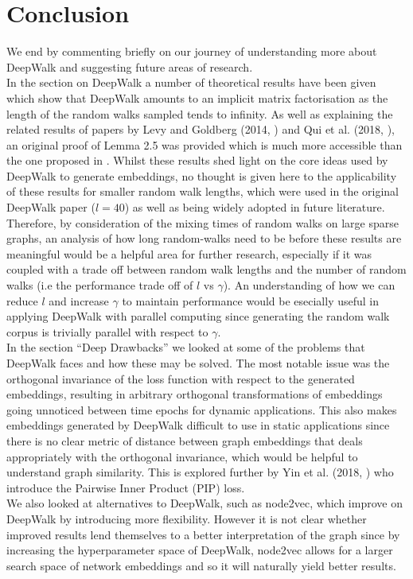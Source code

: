 \documentclass[a4paper]{article}
\begin{document}
\section{Conclusion}
We end by commenting briefly on our journey of understanding more about DeepWalk and suggesting future areas of research.\\
In the section on DeepWalk a number of theoretical results have been given which show that DeepWalk amounts to an implicit matrix factorisation as the length of the random walks sampled tends to infinity.
As well as explaining the related results of papers by Levy and Goldberg (2014, \cite{levy&goldberg}) and  Qui et al. (2018, \cite{qiu2018}), an original proof of Lemma 2.5 was provided which is much more accessible than the one proposed in \cite{qiu2018}.
Whilst these results shed light on the core ideas used by DeepWalk to generate embeddings, no thought is given here to the applicability of these results for smaller random walk lengths, which were used in the original DeepWalk paper ($l = 40$) as well as being widely adopted in future literature. Therefore, by consideration of the mixing times of random walks on large sparse graphs, an analysis of how long random-walks need to be before these
results are meaningful would be a helpful area for further research, especially if it was coupled with a trade off between random walk lengths and the number of random walks (i.e the performance trade off of $l$ vs $\gamma$). An understanding of how we can reduce $l$ and increase $\gamma$ to maintain performance would be esecially useful in applying DeepWalk with parallel computing since generating the random walk corpus is trivially parallel with respect to $\gamma$.\\
In the section ``Deep Drawbacks'' we looked at some of the problems that DeepWalk faces and how these may be solved. The most notable issue was the orthogonal invariance of the loss function with respect to the generated embeddings, resulting in arbitrary orthogonal transformations of embeddings going unnoticed
between time epochs for dynamic applications. This also makes embeddings generated by DeepWalk difficult to use in static applications since there is no clear metric of distance between graph embeddings that deals appropriately with the orthogonal invariance, which would be helpful to understand graph similarity. This is explored further by Yin et al. (2018, \cite{yin2018}) who introduce the Pairwise Inner Product (PIP) loss.\\
We also looked at alternatives to DeepWalk, such as node2vec, which improve on DeepWalk by introducing more flexibility. However it is not clear whether improved results lend themselves to a better interpretation of the graph since by increasing the hyperparameter space of DeepWalk, node2vec allows for a larger search space of network embeddings and so it will naturally yield better results.
\end{document}
